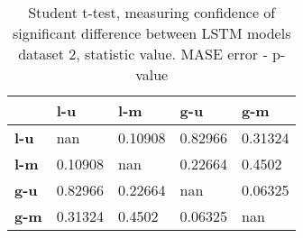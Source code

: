 \begin{table}[h]
\centering
\caption{Student t-test, measuring confidence of significant difference between LSTM models dataset 2, statistic value. MASE error - p-value}
\label{table:ttest-p-values-lstm-experiments-MASE-dataset-2}
\begin{tabular}{lllll}
\toprule
{} &      l-u &      l-m &      g-u &      g-m \\
\midrule
\textbf{l-u} &      nan &  0.10908 &  0.82966 &  0.31324 \\
\textbf{l-m} &  0.10908 &      nan &  0.22664 &   0.4502 \\
\textbf{g-u} &  0.82966 &  0.22664 &      nan &  0.06325 \\
\textbf{g-m} &  0.31324 &   0.4502 &  0.06325 &      nan \\
\bottomrule
\end{tabular}
\end{table}
